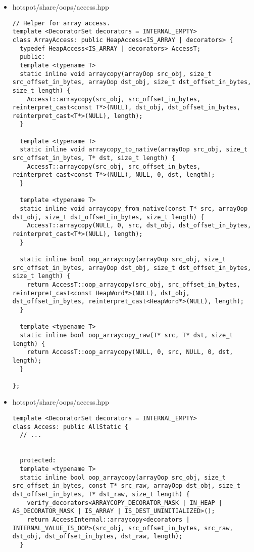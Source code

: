 \begin{itemize}
\item hotspot/share/oops/access.hpp\\
\begin{verbatim}
// Helper for array access.
template <DecoratorSet decorators = INTERNAL_EMPTY>
class ArrayAccess: public HeapAccess<IS_ARRAY | decorators> {
  typedef HeapAccess<IS_ARRAY | decorators> AccessT;
  public:
  template <typename T>
  static inline void arraycopy(arrayOop src_obj, size_t src_offset_in_bytes, arrayOop dst_obj, size_t dst_offset_in_bytes, size_t length) {
    AccessT::arraycopy(src_obj, src_offset_in_bytes, reinterpret_cast<const T*>(NULL), dst_obj, dst_offset_in_bytes, reinterpret_cast<T*>(NULL), length);
  }
  
  template <typename T>
  static inline void arraycopy_to_native(arrayOop src_obj, size_t src_offset_in_bytes, T* dst, size_t length) {
    AccessT::arraycopy(src_obj, src_offset_in_bytes, reinterpret_cast<const T*>(NULL), NULL, 0, dst, length);
  }
  
  template <typename T>
  static inline void arraycopy_from_native(const T* src, arrayOop dst_obj, size_t dst_offset_in_bytes, size_t length) {
    AccessT::arraycopy(NULL, 0, src, dst_obj, dst_offset_in_bytes, reinterpret_cast<T*>(NULL), length);
  }

  static inline bool oop_arraycopy(arrayOop src_obj, size_t src_offset_in_bytes, arrayOop dst_obj, size_t dst_offset_in_bytes, size_t length) {
    return AccessT::oop_arraycopy(src_obj, src_offset_in_bytes, reinterpret_cast<const HeapWord*>(NULL), dst_obj, dst_offset_in_bytes, reinterpret_cast<HeapWord*>(NULL), length);
  }
  
  template <typename T>
  static inline bool oop_arraycopy_raw(T* src, T* dst, size_t length) {
    return AccessT::oop_arraycopy(NULL, 0, src, NULL, 0, dst, length);
  }
  
};
\end{verbatim}

\item hotspot/share/oops/access.hpp\\
\begin{verbatim}
template <DecoratorSet decorators = INTERNAL_EMPTY>
class Access: public AllStatic {
  // ...

  
  protected:
  template <typename T>
  static inline bool oop_arraycopy(arrayOop src_obj, size_t src_offset_in_bytes, const T* src_raw, arrayOop dst_obj, size_t dst_offset_in_bytes, T* dst_raw, size_t length) {
    verify_decorators<ARRAYCOPY_DECORATOR_MASK | IN_HEAP | AS_DECORATOR_MASK | IS_ARRAY | IS_DEST_UNINITIALIZED>();
    return AccessInternal::arraycopy<decorators | INTERNAL_VALUE_IS_OOP>(src_obj, src_offset_in_bytes, src_raw, dst_obj, dst_offset_in_bytes, dst_raw, length);
  }
  

\end{verbatim}
\end{itemize}
